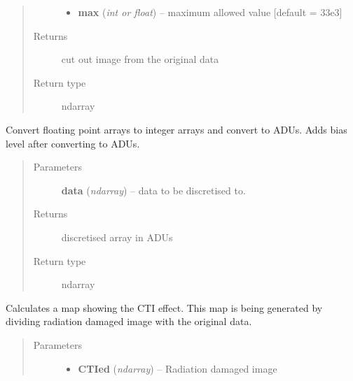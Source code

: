 \documentclass[a4paper,12pt,english]{sphinxmanual}
\begin{document}
\begin{fulllineitems}
\begin{fulllineitems}
\begin{quote}
\begin{description}
\begin{itemize}
\item {} 
\textbf{max} (\emph{int or float}) -- maximum allowed value {[}default = 33e3{]}

\end{itemize}

\item[{Returns}] \leavevmode
cut out image from the original data

\item[{Return type}] \leavevmode
ndarray

\end{description}\end{quote}

\end{fulllineitems}


\begin{fulllineitems}
\label{postproc:postproc.postprocessing.PostProcessing.discretisetoADUs}
Convert floating point arrays to integer arrays and convert to ADUs.
Adds bias level after converting to ADUs.
\begin{quote}\begin{description}
\item[{Parameters}] \leavevmode
\textbf{data} (\emph{ndarray}) -- data to be discretised to.

\item[{Returns}] \leavevmode
discretised array in ADUs

\item[{Return type}] \leavevmode
ndarray

\end{description}\end{quote}

\end{fulllineitems}


\begin{fulllineitems}
\label{postproc:postproc.postprocessing.PostProcessing.generateCTImap}
Calculates a map showing the CTI effect. This map is being
generated by dividing radiation damaged image with the original
data.
\begin{quote}\begin{description}
\item[{Parameters}] \leavevmode\begin{itemize}
\item {} 
\textbf{CTIed} (\emph{ndarray}) -- Radiation damaged image


\end{itemize}
\end{description}
\end{quote}
\end{fulllineitems}
\end{fulllineitems}
\end{document}
